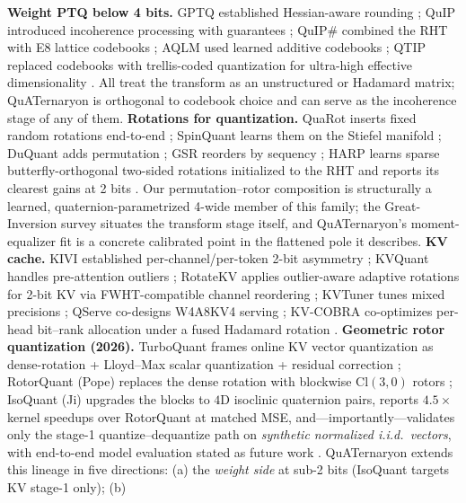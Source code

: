 \documentclass{article}
\begin{document}
\textbf{Weight PTQ below 4 bits.} GPTQ established Hessian-aware rounding
\citep{frantar2023gptq}; QuIP introduced incoherence processing with guarantees
\citep{chee2023quip}; QuIP\# combined the RHT with E8 lattice codebooks
\citep{tseng2024quipsharp}; AQLM used learned additive codebooks
\citep{egiazarian2024aqlm}; QTIP replaced codebooks with trellis-coded
quantization for ultra-high effective dimensionality \citep{tseng2024qtip}.
All treat the transform as an unstructured or Hadamard matrix; QuATernaryon
is orthogonal to codebook choice and can serve as the incoherence stage of any
of them. \textbf{Rotations for quantization.} QuaRot inserts fixed random
rotations end-to-end \citep{ashkboos2024quarot}; SpinQuant learns them on the
Stiefel manifold \citep{liu2024spinquant}; DuQuant adds permutation
\citep{lin2024duquant}; GSR reorders by sequency \citep{choi2025gsr}; HARP learns sparse
butterfly-orthogonal two-sided rotations initialized to the RHT and reports its
clearest gains at 2 bits \citep{zagitov2026harp}. Our permutation--rotor
composition is structurally a learned, quaternion-parametrized 4-wide member of
this family; the Great-Inversion survey \citep{jokar2026inversion} situates the
transform stage itself, and QuATernaryon's moment-equalizer fit is a concrete
calibrated point in the flattened pole it describes. \textbf{KV cache.} KIVI established per-channel/per-token 2-bit
asymmetry \citep{liu2024kivi}; KVQuant handles pre-attention outliers
\citep{hooper2024kvquant}; RotateKV applies outlier-aware adaptive rotations
for 2-bit KV via FWHT-compatible channel reordering \citep{su2025rotatekv};
KVTuner tunes mixed precisions \citep{li2025kvtuner}; QServe co-designs
W4A8KV4 serving \citep{lin2024qserve}; KV-COBRA co-optimizes per-head bit--rank
allocation under a fused Hadamard rotation \citep{ha2026kvcobra}.
\textbf{Geometric rotor quantization (2026).} TurboQuant frames online KV
vector quantization as dense-rotation + Lloyd--Max scalar quantization +
residual correction \citep{google2025turboquant}; RotorQuant (Pope) replaces
the dense rotation with blockwise $\mathrm{Cl}(3,0)$ rotors
\citep{pope2026rotorquant}; IsoQuant (Ji) upgrades the blocks to $4$D
isoclinic quaternion pairs, reports $4.5\times$ kernel speedups over
RotorQuant at matched MSE, and---importantly---validates only the stage-1
quantize--dequantize path on \emph{synthetic normalized i.i.d.\ vectors}, with
end-to-end model evaluation stated as future work \citep{ji2026isoquant}.
QuATernaryon extends this lineage in five directions: (a) the
\emph{weight side} at sub-2 bits (IsoQuant targets KV stage-1 only); (b)
\end{document}
